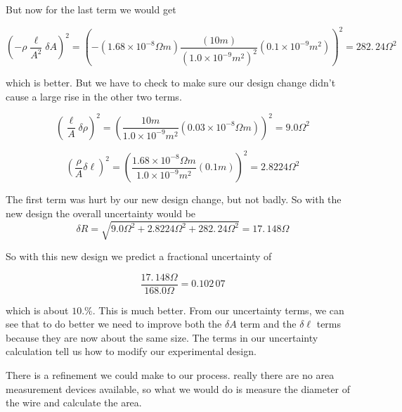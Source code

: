 But now for the last term we would get 

\begin{equation*}
	\left( -\rho \frac{\ell }{A^{2}}\delta A\right) ^{2}=\left( -\left(
	1.68\times 10^{-8}\unit{\Omega}\unit{m}\right) \frac{\left( 10\unit{m}\right) }{\left( 1.0\times 10^{-9}\unit{m}^{2}\right) ^{2}}\left( 0.1\times 10^{-9}\unit{m}^{2}\right) \right)^{2}=282.\,\allowbreak 24\unit{\Omega}^{2}
\end{equation*}

which is better. But we have to check to make sure our design change didn't
cause a large rise in the other two terms. 

\begin{equation*}
	\left( \frac{\ell }{A}\delta \rho \right) ^{2}=\left( \frac{10\unit{m}}{		1.0\times 10^{-9}\unit{m}^{2}}\left( 0.03\times 10^{-8}\unit{\Omega}\unit{m}\right) \right) ^{2}=9.0\unit{\Omega}^{2}
\end{equation*}

\begin{equation*}
	\left( \frac{\rho }{A}\delta \ell \right) ^{2}=\left( \frac{1.68\times
		10^{-8}\unit{\Omega}\unit{m}}{1.0\times 10^{-9}\unit{m}^{2}}\left( 0.1\unit{m}\right) \right)^{2}=2.8224\unit{\Omega}^{2}
\end{equation*}

The first term was hurt by our new design change, but not badly. So with the
new design the overall uncertainty would be 
\begin{equation*}
	\delta R=\sqrt{9.0\unit{\Omega}^{2}+2.8224\unit{\Omega}^{2}+282.\,\allowbreak 24\unit{\Omega		}^{2}}=17.\,\allowbreak 148\unit{\Omega}
\end{equation*}

$\allowbreak $So with this new design we predict a fractional uncertainty of

\begin{equation*}
	\frac{17.\,\allowbreak 148\unit{\Omega}}{168.0\unit{\Omega	}}=0.102\,07
\end{equation*}

which is about $\allowbreak 10.\%.$ This is much better. From our uncertainty terms, we can see that to do better we need to improve both the $\delta A$ term and the $\delta \ell $ terms because they are now about the same size. The terms in our uncertainty calculation tell us how to modify our experimental design.

There is a refinement we could make to our process. really there are no area measurement devices available, so what we would do is measure the diameter of the wire and calculate the area.

